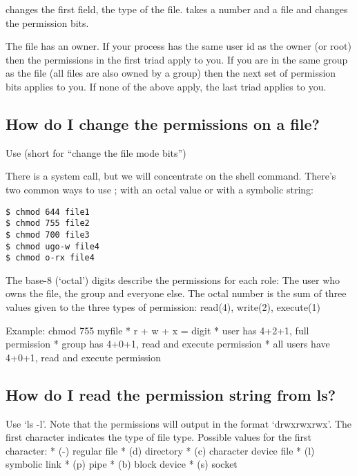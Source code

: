  changes the first field, the type of the file.  takes a number and a file and changes the permission bits.

The file has an owner. If your process has the same user id as the owner (or root) then the permissions in the first triad apply to you. If you are in the same group as the file (all files are also owned by a group) then the next set of permission bits applies to you. If none of the above apply, the last triad applies to you.

\subsection{How do I change the permissions on a file?}\label{how-do-i-change-the-permissions-on-a-file}

Use  (short for ``change the file mode bits'')

There is a system call,  but we will concentrate on the shell command. There's two common ways to use  ; with an octal value or with a symbolic string:

\begin{lstlisting}
$ chmod 644 file1
$ chmod 755 file2
$ chmod 700 file3
$ chmod ugo-w file4
$ chmod o-rx file4
\end{lstlisting}

The base-8 (`octal') digits describe the permissions for each role: The user who owns the file, the group and everyone else. The octal number is the sum of three values given to the three types of permission: read(4), write(2), execute(1)

Example: chmod 755 myfile * r + w + x = digit * user has 4+2+1, full permission * group has 4+0+1, read and execute permission * all users have 4+0+1, read and execute permission

\subsection{How do I read the permission string from ls?}\label{how-do-i-read-the-permission-string-from-ls}

Use `ls -l'. Note that the permissions will output in the format `drwxrwxrwx'. The first character indicates the type of file type. Possible values for the first character: * (-) regular file * (d) directory * (c) character device file * (l) symbolic link * (p) pipe * (b) block device * (s) socket


